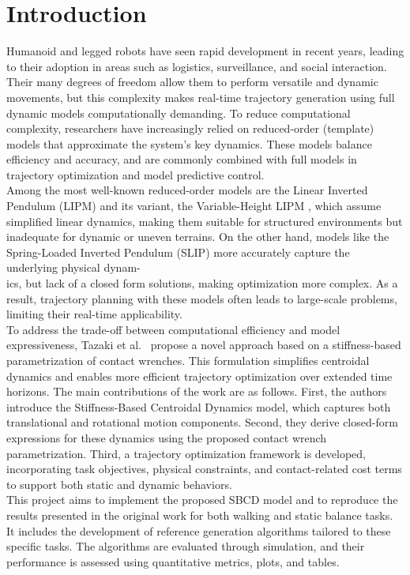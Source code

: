 \documentclass[main.tex]{subfiles}
\begin{document}
\begin{sloppypar}
\section{Introduction}
\label{sec:introduction}
Humanoid and legged robots have seen rapid development in recent years, leading to their adoption in areas such as logistics, surveillance, and social interaction. Their many degrees of freedom allow them to perform versatile and dynamic movements, but this complexity makes real-time trajectory generation using full dynamic models computationally demanding. To reduce computational complexity, researchers have increasingly relied on reduced-order (template) models that approximate the system’s key dynamics. These models balance efficiency and accuracy, and are commonly combined with full models in trajectory optimization and model predictive control. \\
Among the most well-known reduced-order models are the Linear Inverted Pendulum (LIPM) \cite{kajita1991study} and its variant, the Variable-Height LIPM \cite{caron2020biped}, which assume simplified linear dynamics, making them suitable for structured environments but inadequate for dynamic or uneven terrains. On the other hand, models like the Spring-Loaded Inverted Pendulum (SLIP) more accurately capture the underlying physical dynam-\\ics, but lack of a closed form solutions, making optimization more complex. As a result, trajectory planning with these models often leads to large-scale problems, limiting their real-time applicability.\\
To address the trade-off between computational efficiency and model expressiveness, Tazaki et al.~\cite{tazaki2024trajectory} propose a novel approach based on a stiffness-based parametrization of contact wrenches. This formulation simplifies centroidal dynamics and enables more efficient trajectory optimization over extended time horizons. The main contributions of the work are as follows. First, the authors introduce the Stiffness-Based Centroidal Dynamics model, which captures both translational and rotational motion components. Second, they derive closed-form expressions for these dynamics using the proposed contact wrench parametrization. Third, a trajectory optimization framework is developed, incorporating task objectives, physical constraints, and contact-related cost terms to support both static and dynamic behaviors.\\
This project aims to implement the proposed SBCD model and to reproduce the results presented in the original work for both walking and static balance tasks. It includes the development of reference generation algorithms tailored to these specific tasks. The algorithms are evaluated through simulation, and their performance is assessed using quantitative metrics, plots, and tables.\\

\end{sloppypar}
\end{document}
